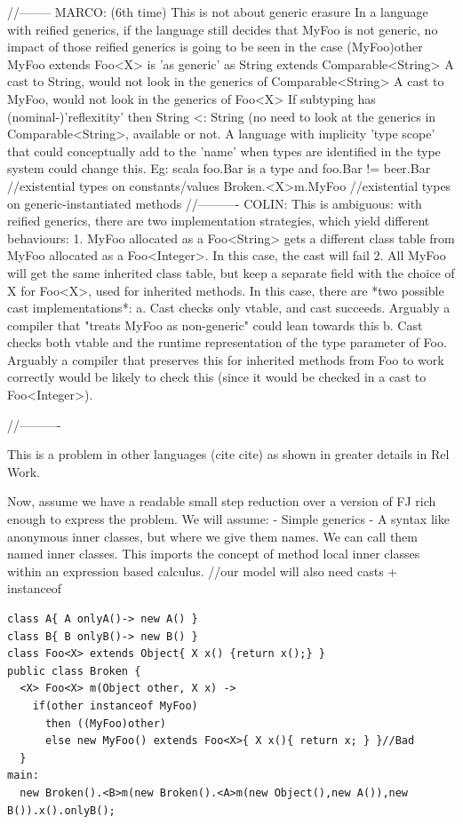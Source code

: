 
//--------
MARCO: (6th time)
This is not about generic erasure
In a language with reified generics, if the language still decides that MyFoo is not generic,
no impact of those reified generics is going to be seen in the case (MyFoo)other
MyFoo extends Foo<X> is 'as generic' as
String extends Comparable<String>{}
A cast to String, would not look in the generics of Comparable<String>
A cast to MyFoo, would not look in the generics of Foo<X>
If subtyping has (nominal-)'reflexitity' then String <: String (no need to look at the generics in Comparable<String>, available or not.
A language with implicity 'type scope' that could conceptually add to the 'name' when types are identified in the type system could change this.
Eg: scala foo.Bar is a type and foo.Bar != beer.Bar //existential types on constants/values
Broken.<X>m.MyFoo  //existential types on generic-instantiated methods
//----------
COLIN: This is ambiguous: with reified generics, there are two implementation strategies, which yield different behaviours:
1. MyFoo allocated as a Foo<String> gets a different class table from MyFoo allocated as a Foo<Integer>. In this case, the cast will fail
2. All MyFoo will get the same inherited class table, but keep a separate field with the choice of X for Foo<X>, used for inherited methods. In this case, there are *two possible cast implementations*:
    a. Cast checks only vtable, and cast succeeds. Arguably a compiler that "treats MyFoo as non-generic" could lean towards this
    b. Cast checks both vtable and the runtime representation of the type parameter of Foo. Arguably a compiler that preserves this for inherited methods from Foo to work correctly would be likely to check this (since it would be checked in a cast to Foo<Integer>).

//----------

This is a problem in other languages (cite cite) as shown in greater details in Rel Work.

Now, assume we have a readable small step reduction over a version of FJ rich enough to express the problem.
We will assume: 
- Simple generics
- A syntax like anonymous inner classes, but where we give them names. We can call them
named inner classes.
This imports the concept of method local inner classes within an expression based calculus.
//our model will also need casts + instanceof
\begin{lstlisting}
class A{ A onlyA()-> new A() }
class B{ B onlyB()-> new B() }
class Foo<X> extends Object{ X x() {return x();} }
public class Broken {
  <X> Foo<X> m(Object other, X x) ->
    if(other instanceof MyFoo)
      then ((MyFoo)other)
      else new MyFoo() extends Foo<X>{ X x(){ return x; } }//Bad
  }
main:
  new Broken().<B>m(new Broken().<A>m(new Object(),new A()),new B()).x().onlyB();
\end{lstlisting}


